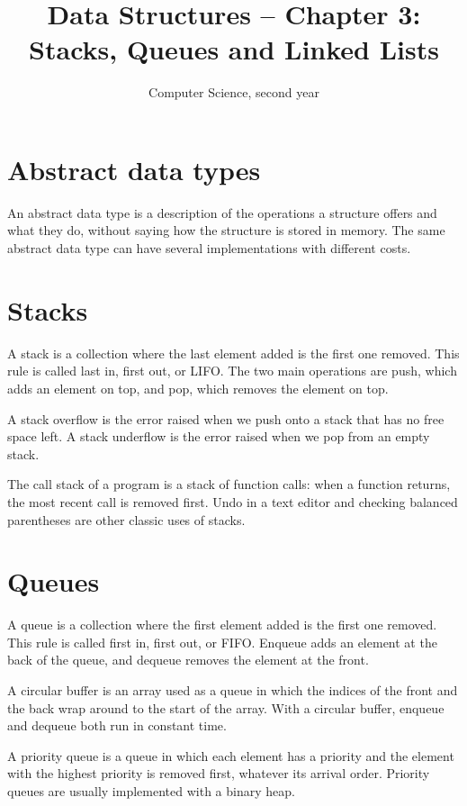 \documentclass[11pt,a4paper]{article}
\title{Data Structures -- Chapter 3: Stacks, Queues and Linked Lists}
\author{Computer Science, second year}
\date{}
\begin{document}
\maketitle

\section{Abstract data types}

An abstract data type is a description of the operations a structure offers and what they do, without saying how the structure is stored in memory. The same abstract data type can have several implementations with different costs.

\section{Stacks}

A stack is a collection where the last element added is the first one removed. This rule is called last in, first out, or LIFO. The two main operations are push, which adds an element on top, and pop, which removes the element on top.

A stack overflow is the error raised when we push onto a stack that has no free space left. A stack underflow is the error raised when we pop from an empty stack.

The call stack of a program is a stack of function calls: when a function returns, the most recent call is removed first. Undo in a text editor and checking balanced parentheses are other classic uses of stacks.

\section{Queues}

A queue is a collection where the first element added is the first one removed. This rule is called first in, first out, or FIFO. Enqueue adds an element at the back of the queue, and dequeue removes the element at the front.

A circular buffer is an array used as a queue in which the indices of the front and the back wrap around to the start of the array. With a circular buffer, enqueue and dequeue both run in constant time.

A priority queue is a queue in which each element has a priority and the element with the highest priority is removed first, whatever its arrival order. Priority queues are usually implemented with a binary heap.
\end{document}
